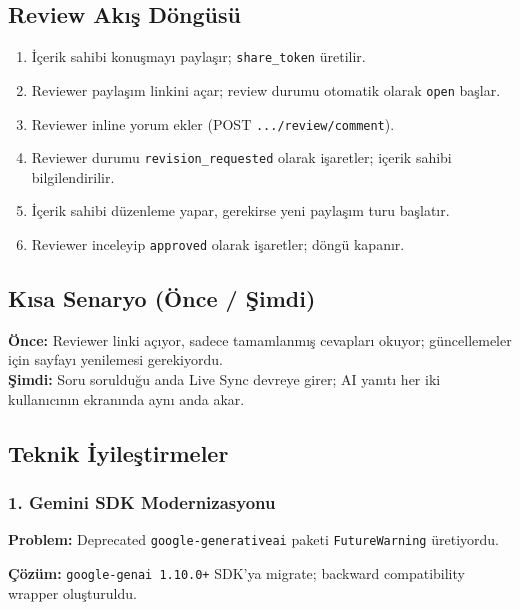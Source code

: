 \documentclass[11pt,a4paper]{article}
\begin{document}
\subsection{Review Akış Döngüsü}

\begin{enumerate}[leftmargin=1.5em]
  \item İçerik sahibi konuşmayı paylaşır; \texttt{share\_token} üretilir.
  \item Reviewer paylaşım linkini açar; review durumu otomatik olarak \texttt{open} başlar.
  \item Reviewer inline yorum ekler (POST \texttt{.../review/comment}).
  \item Reviewer durumu \texttt{revision\_requested} olarak işaretler; içerik sahibi bilgilendirilir.
  \item İçerik sahibi düzenleme yapar, gerekirse yeni paylaşım turu başlatır.
  \item Reviewer inceleyip \texttt{approved} olarak işaretler; döngü kapanır.
\end{enumerate}

\subsection{Kısa Senaryo (Önce / Şimdi)}

\begin{notebox}
\textbf{Önce:} Reviewer linki açıyor, sadece tamamlanmış cevapları okuyor; güncellemeler için sayfayı yenilemesi gerekiyordu.\\[4pt]
\textbf{Şimdi:} Soru sorulduğu anda Live Sync devreye girer; AI yanıtı her iki kullanıcının ekranında aynı anda akar.
\end{notebox}

\subsection{Teknik İyileştirmeler}

\subsubsection{1. Gemini SDK Modernizasyonu}

\textbf{Problem:} Deprecated \texttt{google-generativeai} paketi \texttt{FutureWarning} üretiyordu.

\textbf{Çözüm:} \texttt{google-genai 1.10.0+} SDK'ya migrate; backward compatibility wrapper oluşturuldu.
\end{document}
